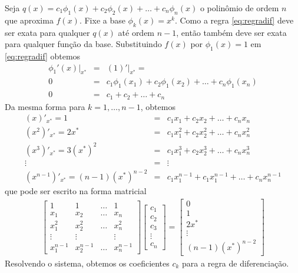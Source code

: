 Seja $q(x)=c_1\phi_1(x)+c_2\phi_2(x)+\ldots +c_n \phi_n(x)$ o polinômio de ordem $n$ que aproxima $f(x)$. Fixe a base $\phi_k(x)=x^k$. Como a regra \eqref{eq:regradif} deve ser exata para qualquer $q(x)$ até ordem $n-1$, então também deve ser exata para qualquer função da base. Substituindo $f(x)$ por $\phi_1(x)=1$ em \eqref{eq:regradif} obtemos
\begin{eqnarray}
\phi_1'(x)|_{x^*} &=& (1)'|_{x^*} = \\
            0   &=&  c_1\phi_1(x_1)+c_2\phi_1(x_2)+\ldots +c_n\phi_1(x_n) \\
            0   &=& c_1+c_2+\ldots +c_n
\end{eqnarray}
Da mesma forma para $k=1,\ldots ,n-1$, obtemos
\begin{eqnarray}
      (x)'_{x^*}  = 1            &=&  c_1x_1      +c_2x_2  +\ldots +c_nx_n \\
      (x^2)'_{x^*}= 2x^*         &=&  c_1x_1^2    +c_2x_2^2+\ldots +c_nx_n^2 \\
      (x^3)'_{x^*}= 3(x^*)^2     &=&  c_1x_1^3    +c_2x_2^3+\ldots +c_nx_n^3 \\
                    \vdots       &=&  \vdots        \\
      (x^{n-1})'_{x^*}= (n-1)(x^*)^{n-2} &=&  c_1x_1^{n-1}+c_1x_1^{n-1}+\ldots +c_nx_n^{n-1}
\end{eqnarray}
que pode ser escrito na forma matricial
\begin{eqnarray}
  \begin{bmatrix}
    1         & 1         & \ldots   & 1 \\
    x_1       & x_2       & \ldots   & x_n \\
    x_1^2     & x_2^2     & \ldots   & x_n^2 \\
    \vdots    & \vdots    &          & \vdots   \\
    x_1^{n-1} & x_2^{n-1} & \ldots   & x_n^{n-1}    
  \end{bmatrix}
  \begin{bmatrix}
    c_1 \\ c_2\\ c_3  \\ \vdots   \\ c_n
  \end{bmatrix}
=
\begin{bmatrix}
  0  \\ 1 \\ 2x^* \\ \vdots  \\ (n-1)(x^*)^{n-2}
\end{bmatrix}
\end{eqnarray}
Resolvendo o sistema, obtemos os coeficientes $c_k$ para a regra de diferenciação.

